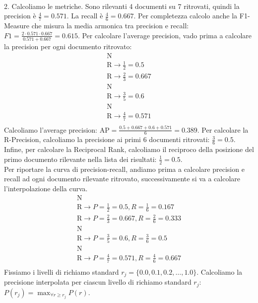 \documentclass{report}
\begin{document}
	\vspace{\baselineskip}\\
	2. Calcoliamo le metriche. Sono rilevanti 4 documenti su 7 ritrovati, quindi la precision è $\frac{4}{7} = 0.571$. La recall è $\frac{4}{6} = 0.667$. Per completezza calcolo anche la F1-Measure che misura la media armonica tra precision e recall: $F1 = \frac{2 \cdot 0.571 \cdot 0.667}{0.571 + 0.667} = 0.615$. Per calcolare l'average precision, vado prima a calcolare la precision per ogni documento ritrovato:
	\[
		\begin{array}{l}
			\text{N} \\
			\text{R} \rightarrow \frac{1}{2} = 0.5\\
			\text{R} \rightarrow \frac{2}{3} = 0.667\\
			\text{N} \\
			\text{R} \rightarrow \frac{3}{5} = 0.6\\
			\text{N} \\
			\text{R} \rightarrow \frac{4}{7} = 0.571\\
		\end{array}
	\]
	Calcoliamo l'average precision: $\text{AP} = \frac{0.5 + 0.667 + 0.6 + 0.571}{6} = 0.389$. Per calcolare la R-Precision,  calcoliamo la precisione ai primi 6 documenti ritrovati: $\frac{3}{6} = 0.5$. Infine, per calcolare la Reciprocal Rank, calcoliamo il reciproco della posizione del primo documento rilevante nella lista dei risultati: $\frac{1}{2} = 0.5$.
	\vspace{\baselineskip}\\
	Per riportare la curva di precision-recall, andiamo prima a calcolare precision e recall ad ogni documento rilevante ritrovato, successivamente si va a calcolare l'interpolazione della curva. 
	\[
		\begin{array}{l}
			\text{N}\\
			\text{R} \rightarrow P = \frac{1}{2} = 0.5, R = \frac{1}{6} = 0.167\\
			\text{R} \rightarrow P = \frac{2}{3} = 0.667, R = \frac{2}{6} = 0.333\\
			\text{N}\\
			\text{R} \rightarrow P = \frac{3}{5} = 0.6, R = \frac{3}{6} = 0.5\\
			\text{N}\\
			\text{R} \rightarrow P = \frac{4}{7} = 0.571, R = \frac{4}{6} = 0.667\\
		\end{array}
	\]
	Fissiamo i livelli di richiamo standard $r_j = \{0.0, 0.1, 0.2, \ldots, 1.0\}$. Calcoliamo la precisione interpolata per ciascun livello di richiamo standard $r_j$: $P(r_j) = \max_{\forall r \geq r_j} P(r)$.
\end{document}
